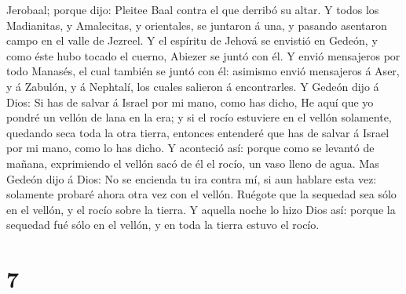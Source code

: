 Jerobaal; porque dijo: Pleitee Baal contra el que derribó su altar.
 Y todos los Madianitas, y Amalecitas, y orientales, se
juntaron á una, y pasando asentaron campo en el valle de Jezreel.
 Y el espíritu de Jehová se envistió en Gedeón, y como
éste hubo tocado el cuerno, Abiezer se juntó con él.  Y
envió mensajeros por todo Manasés, el cual también se juntó con él:
asimismo envió mensajeros á Aser, y á Zabulón, y á Nephtalí, los cuales
salieron á encontrarles.  Y Gedeón dijo á Dios: Si has de
salvar á Israel por mi mano, como has dicho,  He aquí que
yo pondré un vellón de lana en la era; y si el rocío estuviere en el
vellón solamente, quedando seca toda la otra tierra, entonces entenderé
que has de salvar á Israel por mi mano, como lo has dicho.
 Y aconteció así: porque como se levantó de mañana,
exprimiendo el vellón sacó de él el rocío, un vaso lleno de agua.
 Mas Gedeón dijo á Dios: No se encienda tu ira contra mí,
si aun hablare esta vez: solamente probaré ahora otra vez con el vellón.
Ruégote que la sequedad sea sólo en el vellón, y el rocío sobre la
tierra.  Y aquella noche lo hizo Dios así: porque la
sequedad fué sólo en el vellón, y en toda la tierra estuvo el rocío.

\hypertarget{section-6}{%
\section{7}\label{section-6}}

